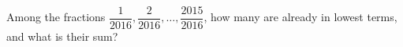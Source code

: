 Among the fractions $\dfrac{1}{2016},\dfrac{2}{2016},\dots,\dfrac{2015}{2016}$, how many are already in lowest terms, and what is their sum?
